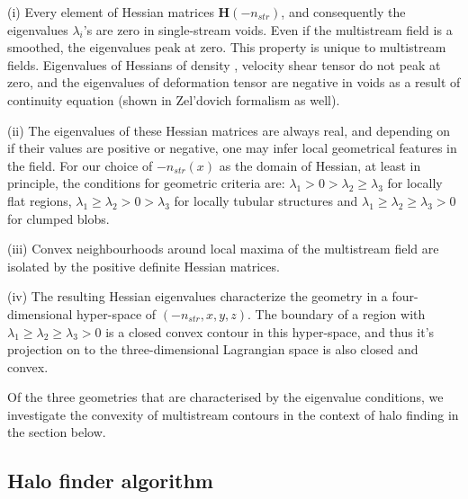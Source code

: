 (i) Every element of Hessian matrices $\mathbf{H}(-n_{str})$, and consequently the eigenvalues $\lambda_i$'s are zero in single-stream voids. Even if the multistream field is a smoothed, the eigenvalues peak at zero. This property is unique to multistream fields. Eigenvalues of Hessians of density \cite{Aragon-Calvo2007}, velocity shear tensor \cite{Libeskind2013} do not peak at zero, and the eigenvalues of deformation tensor are negative in voids as a result of continuity equation (shown in Zel’dovich formalism as well).

(ii) The eigenvalues of these Hessian matrices are always real, and depending on if their values are positive or negative, one may infer local geometrical features in the field. For our choice of $-n_{str}(x)$ as the domain of Hessian, at least in principle, the conditions for geometric criteria are: $\lambda_1 > 0 > \lambda_2 \geq \lambda_3$ for locally flat regions, $\lambda_1 \geq \lambda_2 > 0 > \lambda_3$ for locally tubular structures and $\lambda_1 \geq \lambda_2 \geq \lambda_3 > 0$ for clumped blobs. 

(iii) Convex neighbourhoods around local maxima of the multistream field are isolated by the positive definite Hessian matrices. 

(iv) The resulting Hessian eigenvalues characterize the geometry in a four-dimensional
hyper-space of $(-n_{str}, x, y, z)$. The boundary of a region with $\lambda_1 \geq \lambda_2 \geq \lambda_3 > 0$ is a closed convex contour in this hyper-space, and thus it’s projection on to the three-dimensional Lagrangian space is also closed and convex.

Of the three geometries that are characterised by the eigenvalue conditions, we investigate the convexity of multistream contours in the context of halo finding in the section below.


\subsection{Halo finder algorithm}
\label{subsec:technique}



